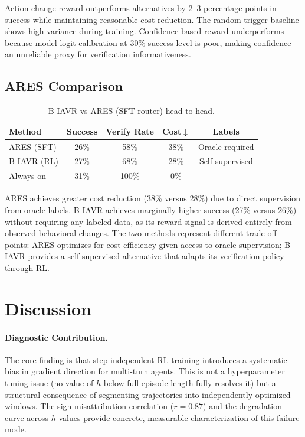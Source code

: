 \documentclass[11pt]{article}
\begin{document}
Action-change reward outperforms alternatives by 2--3 percentage points in success while maintaining reasonable cost reduction. The random trigger baseline shows high variance during training. Confidence-based reward underperforms because model logit calibration at 30\% success level is poor, making confidence an unreliable proxy for verification informativeness.

\subsection{ARES Comparison}

\begin{table}[h]
\centering
\caption{B-IAVR vs ARES (SFT router) head-to-head.}
\label{tab:ares}
\begin{tabular}{lcccc}
\toprule
Method & Success & Verify Rate & Cost$\downarrow$ & Labels \\
\midrule
ARES (SFT) & 26\% & 58\% & 38\% & Oracle required \\
B-IAVR (RL) & 27\% & 68\% & 28\% & Self-supervised \\
Always-on & 31\% & 100\% & 0\% & -- \\
\bottomrule
\end{tabular}
\end{table}

ARES achieves greater cost reduction (38\% versus 28\%) due to direct supervision from oracle labels. B-IAVR achieves marginally higher success (27\% versus 26\%) without requiring any labeled data, as its reward signal is derived entirely from observed behavioral changes. The two methods represent different trade-off points: ARES optimizes for cost efficiency given access to oracle supervision; B-IAVR provides a self-supervised alternative that adapts its verification policy through RL.

\section{Discussion}

\paragraph{Diagnostic Contribution.}
The core finding is that step-independent RL training introduces a systematic bias in gradient direction for multi-turn agents. This is not a hyperparameter tuning issue (no value of $h$ below full episode length fully resolves it) but a structural consequence of segmenting trajectories into independently optimized windows. The sign misattribution correlation ($r=0.87$) and the degradation curve across $h$ values provide concrete, measurable characterization of this failure mode.
\end{document}
